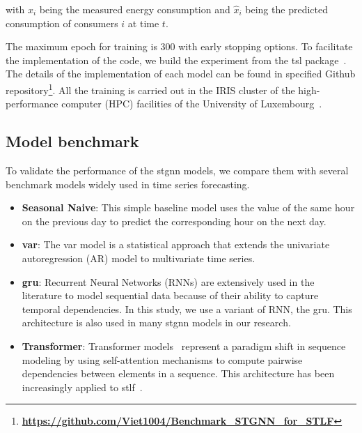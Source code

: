 with $x_i$ being the measured energy consumption and $\hat{x}_i$ being the predicted consumption of consumers $i$ at time $t$. 

The maximum epoch for training is 300 with early stopping options. To facilitate the implementation of the code, we build the experiment from the tsl package~\cite{Cini_Torch_Spatiotemporal_2022}. The details of the implementation of each model can be found in specified Github repository\footnote{\textbf{\href{https://github.com/Viet1004/Benchmark_STGNN_for_STLF}{https://github.com/Viet1004/Benchmark\_STGNN\_for\_STLF}}}. All the training is carried out in the IRIS cluster of the high-performance computer (HPC) facilities of the University of Luxembourg~\cite{ORBi-aab35225-a6bc-496d-a6e7-621189ebff46}.

\subsection{Model benchmark}\label{subsec:model_benchmark}
To validate the performance of the \acrshort{stgnn} models, we compare them with several benchmark models widely used in time series forecasting.

\begin{itemize}
    \item \textbf{Seasonal Naive}: This simple baseline model uses the value of the same hour on the previous day to predict the corresponding hour on the next day. 

    \item \textbf{\acrfull{var}}: The \acrfull{var} model is a statistical approach that extends the univariate autoregression (AR) model to multivariate time series. 

    \item \textbf{\acrshort{gru}}: Recurrent Neural Networks (RNNs) are extensively used in the literature to model sequential data because of their ability to capture temporal dependencies. In this study, we use a variant of RNN, the \acrfull{gru}. This architecture is also used in many \acrshort{stgnn} models in our research.

    \item \textbf{Transformer}: Transformer models~\cite{vaswani_attention_2023} represent a paradigm shift in sequence modeling by using self-attention mechanisms to compute pairwise dependencies between elements in a sequence. This architecture has been increasingly applied to \acrshort{stlf}~\cite{zhao_spatial_2023}.
\end{itemize}

